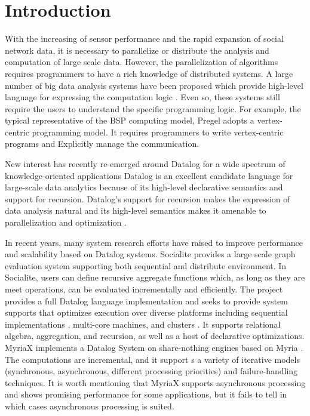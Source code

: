 \section{Introduction}
With the increasing of sensor performance and the rapid expansion of social network data, it is necessary to parallelize or distribute the analysis and computation of large scale data. However, the parallelization of algorithms requires programmers to have a rich knowledge of distributed systems. A large number of big data analysis systems have been proposed which provide high-level language for expressing the computation logic \cite{}. Even so, these systems still require the users to understand the specific programming logic. For example, the typical representative of the BSP computing model, Pregel \cite{} adopts a vertex-centric programming model. It requires programmers to write vertex-centric programs and Explicitly manage the communication.

New interest has recently re-emerged around Datalog for a wide spectrum of knowledge-oriented applications \cite{}%
Datalog is an excellent candidate language for large-scale data analytics because of its high-level declarative semantics and support for recursion. Datalog's support for recursion makes the expression of data analysis natural \cite{} and its high-level semantics makes it amenable to parallelization and optimization \cite{}.


In recent years, many system research efforts have raised to improve performance  and scalability based on Datalog systems. Socialite \cite{socialite} provides a large scale graph evaluation system supporting both sequential and distribute environment. In Socialite, users can define recursive aggregate functions which, as long as they are meet operations, can be evaluated incrementally and efficiently. The \cite{7113340} project provides a full Datalog language implementation and seeks to provide  system supports that optimizes execution over diverse platforms including sequential implementations \cite{Shkapsky:2016:BDA:2882903.2915229}, multi-core machines, and clusters \cite{bigdatalog}. It supports relational algebra, aggregation, and recursion, as well as a host of declarative optimizations. MyriaX \cite{Halperin:2014:DMB:2588555.2594530} implements a Datalog System on share-nothing engines based on Myria \cite{}. The computations are incremental, and it support s a variety of iterative models (synchronous, asynchronous, different processing priorities) and failure-handling techniques. It is worth mentioning that MyriaX supports asynchronous processing and shows promising performance for some applications, but it fails to tell in which cases asynchronous processing is suited.

